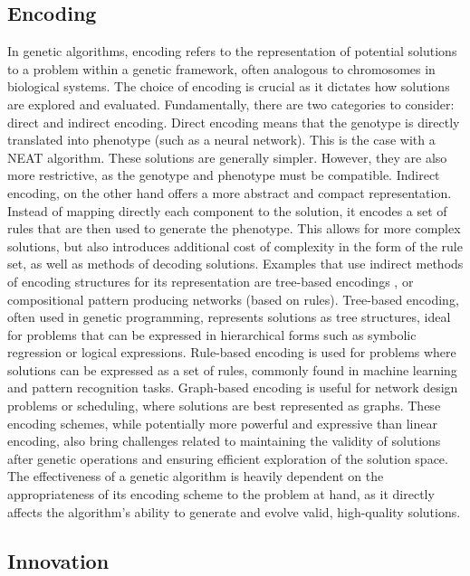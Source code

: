 \documentclass{article}
\begin{document}
\subsection{Encoding}
In genetic algorithms, encoding refers to the representation of potential solutions to a problem within a genetic framework, often analogous to chromosomes in biological systems.
The choice of encoding is crucial as it dictates how solutions are explored and evaluated.
Fundamentally, there are two categories to consider: direct and indirect encoding.
Direct encoding means that the genotype is directly translated into phenotype (such as a neural network). This is the case with a NEAT algorithm.
These solutions are generally simpler. However, they are also more restrictive, as the genotype and phenotype must be compatible.
Indirect encoding, on the other hand offers a more abstract and compact representation. Instead of mapping directly each component to the solution,
it encodes a set of rules that are then used to generate the phenotype. This allows for more complex solutions, but also introduces additional 
cost of complexity in the form of the rule set, as well as methods of decoding solutions.
Examples that use indirect methods of encoding structures for its representation are tree-based encodings \cite{encoding}, or compositional pattern producing networks (based on rules).\cite{HyperNeat} 
Tree-based encoding, often used in genetic programming, represents solutions as tree structures, 
ideal for problems that can be expressed in hierarchical forms such as symbolic regression or logical expressions.
Rule-based encoding is used for problems where solutions can be expressed as a set of rules,
commonly found in machine learning and pattern recognition tasks. Graph-based encoding is useful for network design problems or scheduling,
where solutions are best represented as graphs. These encoding schemes, while potentially more powerful and expressive than linear encoding,
also bring challenges related to maintaining the validity of solutions after genetic operations and ensuring efficient exploration of the solution space.
The effectiveness of a genetic algorithm is heavily dependent on the appropriateness of its encoding scheme to the problem at hand, as it directly affects the algorithm's ability to generate and evolve valid, high-quality solutions.
\subsection{Innovation}
\end{document}
